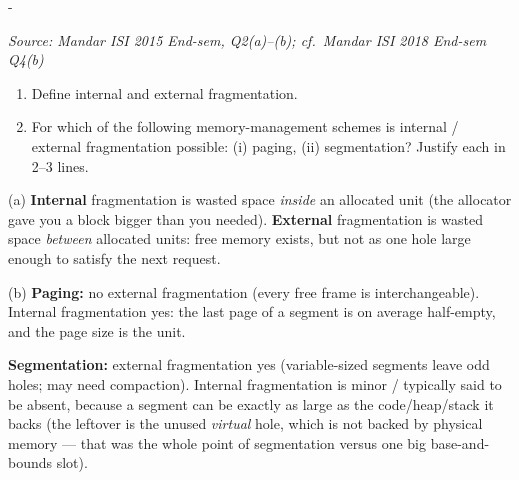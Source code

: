 \documentclass[11pt,a4paper]{article}
\makeatletter
\newcommand{\keepspace}[1]{\par\penalty-100\begingroup
  \setlength{\dimen@}{#1}\dimen@ii\pagegoal\advance\dimen@ii-\pagetotal
  \ifdim\dimen@>\dimen@ii\ifdim\dimen@ii>\z@\vfil\fi\break\fi\endgroup}
\newcounter{qn}[section]
\newenvironment{Qn}[4]{%
  \refstepcounter{qn}\keepspace{7\baselineskip}%
  \begin{tcolorbox}[qboxstyle, title={Q\thesection.\theqn\ \ [#1 \textbar\ #2]\ \ #4}]%
  {\footnotesize\color{g3}\textit{Source: #3}}\par\smallskip%
}{%
  \end{tcolorbox}%
}
\newenvironment{Sol}{%
  \begin{tcolorbox}[sboxstyle, title={Solution}]%
}{%
  \end{tcolorbox}\vspace{0.35em}%
}
\makeatother
\begin{document}
\begin{Qn}{Easy-Medium}{Lect 10}{Mandar ISI 2015 End-sem, Q2(a)--(b); cf.\ Mandar ISI 2018 End-sem Q4(b)}{Internal vs.\ external fragmentation under paging and segmentation}
\begin{enumerate}
  \item[(a)] Define internal and external fragmentation.
  \item[(b)] For which of the following memory-management schemes is
        internal / external fragmentation possible: (i) paging,
        (ii) segmentation? Justify each in 2--3 lines.
\end{enumerate}
\end{Qn}
\begin{Sol}
(a) \textbf{Internal} fragmentation is wasted space \emph{inside} an
allocated unit (the allocator gave you a block bigger than you
needed). \textbf{External} fragmentation is wasted space
\emph{between} allocated units: free memory exists, but not as one
hole large enough to satisfy the next request.

(b) \textbf{Paging:} no external fragmentation (every free frame is
interchangeable). Internal fragmentation yes: the last page of a
segment is on average half-empty, and the page size is the unit.

\textbf{Segmentation:} external fragmentation yes (variable-sized
segments leave odd holes; may need compaction). Internal
fragmentation is minor / typically said to be absent, because a
segment can be exactly as large as the code/heap/stack it backs
(the leftover is the unused \emph{virtual} hole, which is not
backed by physical memory --- that was the whole point of
segmentation versus one big base-and-bounds slot).
\end{Sol}
\end{document}
